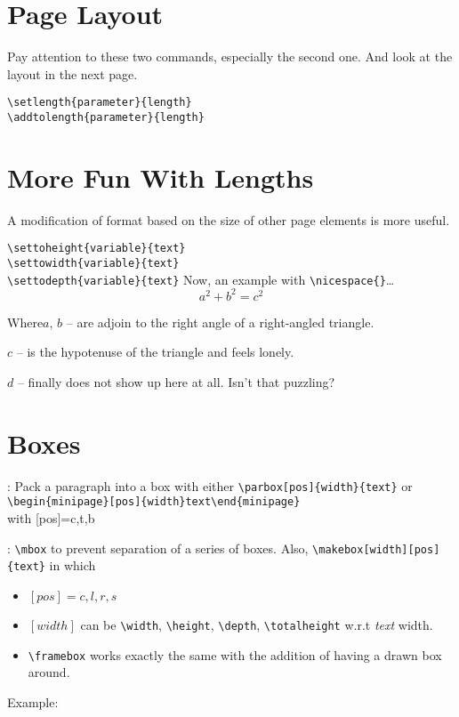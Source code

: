 \documentclass[a4paper,11pt]{article}
\begin{document}
\section{Page Layout}
Pay attention to these two commands, especially the second one.
And look at the layout in the next page.

\smallskip
\verb+\setlength{parameter}{length}+\\
\verb+\addtolength{parameter}{length}+
\layout

\section{More Fun With Lengths}
A modification of format based on the size of
other page elements is more useful.

\smallskip
\verb+\settoheight{variable}{text}+\\
\verb+\settowidth{variable}{text}+\\
\verb+\settodepth{variable}{text}+
\smallskip
\flushleft
Now, an example with \verb+\nicespace{}+\ldots
\begin{displaymath}
  a^2+b^2=c^2
\end{displaymath}

\begin{nicespace}{Where}$a$,
  $b$ -- are adjoin to the right angle
  of a right-angled triangle.

  $c$ -- is the hypotenuse of the triangle and
  feels lonely.

  $d$ -- finally does not show up here at all.
  Isn't that puzzling?
\end{nicespace}

\section{Boxes}
:
Pack a paragraph into a box with either
\verb+\parbox[pos]{width}{text}+ or\\
\verb+\begin{minipage}[pos]{width}text\end{minipage}+\\
with [pos]=c,t,b

: \verb+\mbox+ to prevent
separation of a series of boxes. Also,
\verb+\makebox[width][pos]{text}+ in which
\begin{itemize}
  \item $[pos]=c,l,r,s$
  \item $[width]$ can be \verb+\width+, \verb+\height+,
  \verb+\depth+, \verb+\totalheight+ w.r.t \emph{text}
  width.
  \item \verb+\framebox+ works exactly the same with
  the addition of having a drawn box around.
\end{itemize}
Example:
\par
{}\par
\end{document}
